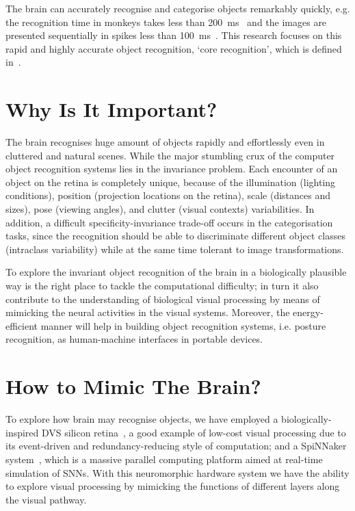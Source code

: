 The brain can accurately recognise and categorise objects remarkably quickly, e.g. the recognition time in monkeys takes less than 200~ms~\cite{fabre1998rapid} and the images are presented sequentially in spikes less than 100~ms~\cite{keysers2001speed}.
This research focuses on this rapid and highly accurate object recognition, `core recognition', which is defined in~\cite{dicarlo2007untangling}.


\section{Why Is It Important?}
\label{sec:imp}
The brain recognises huge amount of objects rapidly and effortlessly even in cluttered and natural scenes.
While the major stumbling crux of the computer object recognition systems lies in the invariance problem.
Each encounter of an object on the retina is completely unique, because of the illumination (lighting conditions), position (projection locations on the retina), scale (distances and sizes), pose (viewing angles), and clutter (visual contexts) variabilities.
In addition, a difficult specificity-invariance trade-off occurs in the categorisation tasks, since the recognition should be able to discriminate different object classes (intraclass variability) while at the same time tolerant to image transformations.   

To explore the invariant object recognition of the brain in a biologically plausible way is the right place to tackle the computational difficulty;
in turn it also contribute to the understanding of biological visual processing by means of mimicking the neural activities in the visual systems.
Moreover, the energy-efficient manner will help in building object recognition systems, i.e. posture recognition, as human-machine interfaces in portable devices.  

\section{How to Mimic The Brain?}
\label{sec:brn}
To explore how brain may recognise objects, we have employed a biologically-inspired DVS silicon retina~\cite{lenero20113}, a good example of low-cost visual processing due to its event-driven and redundancy-reducing style of computation;
and a SpiNNaker system~\cite{furber2014spinnaker}, which is a massive parallel computing platform aimed at real-time simulation of SNNs. 
With this neuromorphic hardware system we have the ability to explore visual processing by mimicking the functions of different layers along the visual pathway. 

